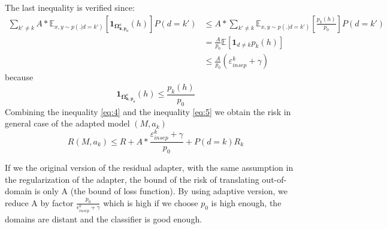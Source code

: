 \documentclass[12pt,a4paper,twoside]{report}
\theoremstyle{definition}
\newcommand{\fyTodo}[1]{\Todo[FY:]{\textcolor{orange}{#1}}}
\begin{document}
The last inequality is verified since:
\begin{equation}
\begin{split}
\displaystyle{\mathop{\sum}_{k' \neq k}} A * \mathbb{E}_{x,y \sim p(.|d=k')} [\mathbf{1}_{\mathbf{\Omega_{k,p_{0}}^{c}}} (h)]P(d=k') &\leq A * \displaystyle{\mathop{\sum}_{k' \neq k}} \mathbb{E}_{x,y \sim p(.|d=k') } [\frac{p_k(h)}{p_0}]P(d=k') \\
		& = \frac{A}{p_0} \mathbb{E}[\mathbf{1}_{d\neq k}p_k(h)] \\
		& \leq \frac{A}{p_0} (\mathbb{\varepsilon}_{insep}^k + \gamma)
\end{split}
\end{equation}
because
$$ \mathbf{1}_{\mathbf{\Omega_{k,p_{0}}^{c}}}(h) \leq \frac{p_k(h)}{p_0} $$
Combining the inequality \ref{eq:4} and the inequality \ref{eq:5} we obtain the risk in general case of the adapted model $(M,a_k)$ $$R(M,a_k) \leq R + A * \frac{\mathbb{\varepsilon}_{insep}^k + \gamma}{p_0} + P(d=k)R_k$$

If we the original version of the residual adapter, with the same assumption in the regularization of the adapter, the bound of the risk of translating out-of-domain is only A (the bound of loss function). By using adaptive version, we reduce A by factor $\frac{p_0}{\epsilon^k_{insep}+\gamma}$ which is high if we choose $p_0$ is high enough, the domains are distant and the classifier is good enough. 


\fyTodo{I sort of buy the equations but then so what ? We should may be compare with non-adaptive ?}
\end{document}
